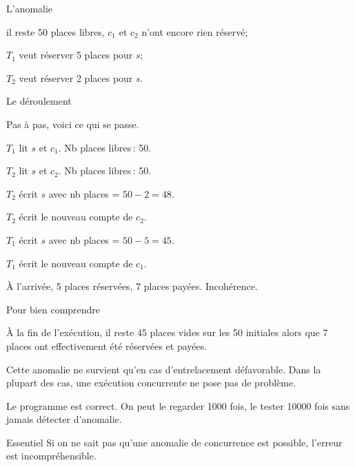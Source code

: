 \begin{frame}{L'anomalie}

\begin{redbullet}
  \item il reste 50 places libres, $c_1$ et $c_2$ 
           n'ont encore rien réservé;
  \item $T_1$ veut réserver 5 places pour  $s$;
  \item $T_2$ veut réserver 2 places pour  $s$.
\end{redbullet}

\vfill

\end{frame}



\begin{frame}[fragile]{Le déroulement}

Pas à pas, voici ce qui se passe.

\begin{redbullet}
  \item $T_1$ lit $s$ et $c_1$. Nb places libres\,: 50.
  \item $T_2$ lit $s$ et $c_2$. Nb places libres\,: 50.
  \item $T_2$ écrit $s$ avec nb places = $50-2=48$.
  \item $T_2$ écrit le nouveau compte de $c_2$.
  \item $T_1$ écrit $s$ avec nb places = $50-5=45$.
  \item $T_1$ écrit le nouveau compte de $c_1$.
\end{redbullet}

\vfill
\begin{blocgauche}
À l'arrivée, 5 places réservées, 7 places payées. \alert{Incohérence}.
\end{blocgauche}
\end{frame}



\begin{frame}{Pour bien comprendre}

À la fin de l'exécution, il
reste 45 places vides sur les 50 initiales
alors que 7 places ont effectivement été
réservées et payées.

\vfill

\alert{Cette anomalie ne survient qu'en cas d'entrelacement défavorable}. Dans la plupart
des cas, une exécution concurrente ne pose pas de problème.

\vfill

\alert{Le programme est correct}. On peut le regarder 1000 fois, le tester 10000 fois sans jamais détecter
d'anomalie.

\vfill

\begin{blocgauche}
\begin{defblock}{\alert{Essentiel}}
Si on ne sait pas qu'une anomalie de concurrence est possible, l'erreur est incompréhensible.
\end{defblock}
\end{blocgauche}
\end{frame}

